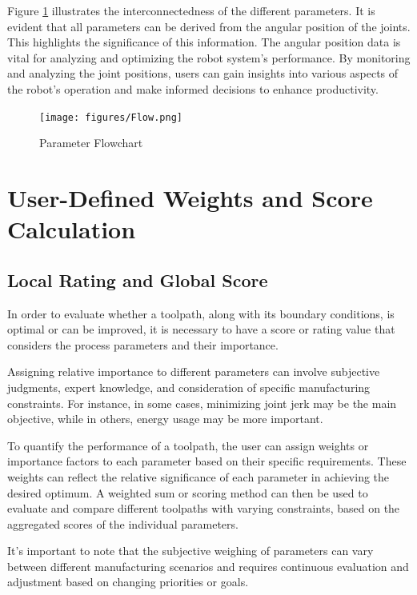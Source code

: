 Figure \ref{ParamsFlow} illustrates the interconnectedness of the different parameters. It is evident that all parameters can be derived from the angular position of the joints. This highlights the significance of this information. The angular position data is vital for analyzing and optimizing the robot system's performance. By monitoring and analyzing the joint positions, users can gain insights into various aspects of the robot's operation and make informed decisions to enhance productivity.




\begin{figure}[H]
	\centerline{\texttt{[image: figures/Flow.png]}}
	\caption{Parameter Flowchart}
	\label{ParamsFlow}
\end{figure}

\newpage

\section{User-Defined Weights and Score Calculation}\label{weights}
\subsection{Local Rating and Global Score}
In order to evaluate whether a toolpath, along with its boundary conditions, is optimal or can be improved, it is necessary to have a score or rating value that considers the process parameters and their importance.

Assigning relative importance to different parameters can involve subjective judgments, expert knowledge, and consideration of specific manufacturing constraints. For instance, in some cases, minimizing joint jerk may be the main objective, while in others, energy usage may be more important.

To quantify the performance of a toolpath, the user can assign weights or importance factors to each parameter based on their specific requirements. These weights can reflect the relative significance of each parameter in achieving the desired optimum. A weighted sum or scoring method can then be used to evaluate and compare different toolpaths with varying constraints, based on the aggregated scores of the individual parameters. %

It's important to note that the subjective weighing of parameters can vary between different manufacturing scenarios and requires continuous evaluation and adjustment based on changing priorities or goals.


